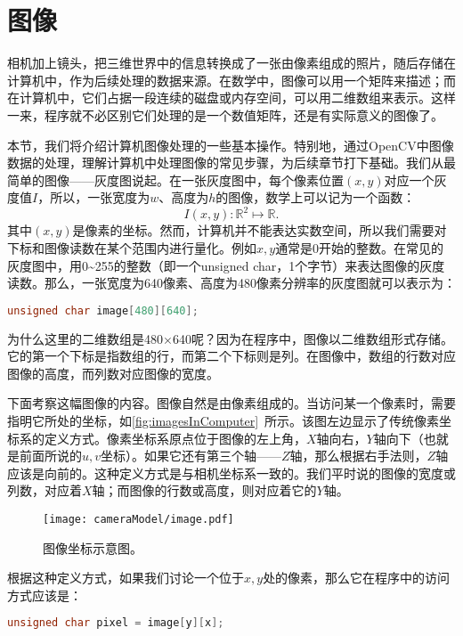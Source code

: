 \section{图像}
相机加上镜头，把三维世界中的信息转换成了一张由像素组成的照片，随后存储在计算机中，作为后续处理的数据来源。在数学中，图像可以用一个矩阵来描述；而在计算机中，它们占据一段连续的磁盘或内存空间，可以用二维数组来表示。这样一来，程序就不必区别它们处理的是一个数值矩阵，还是有实际意义的图像了。

本节，我们将介绍计算机图像处理的一些基本操作。特别地，通过OpenCV中图像数据的处理，理解计算机中处理图像的常见步骤，为后续章节打下基础。我们从最简单的图像——灰度图说起。在一张灰度图中，每个像素位置$(x,y)$对应一个灰度值$I$，所以，一张宽度为$w$、高度为$h$的图像，数学上可以记为一个函数：
\[
{I} (x,y): \mathbb{R}^2 \mapsto \mathbb{R}.
\]
其中$(x,y)$是像素的坐标。然而，计算机并不能表达实数空间，所以我们需要对下标和图像读数在某个范围内进行量化。例如$x,y$通常是0开始的整数。在常见的灰度图中，用0\textasciitilde255的整数（即一个unsigned char，1个字节）来表达图像的灰度读数。那么，一张宽度为640像素、高度为480像素分辨率的灰度图就可以表示为：

\begin{lstlisting}[language=C++, caption=二维数组表达图像]
unsigned char image[480][640];
\end{lstlisting}

为什么这里的二维数组是480$\times$640呢？因为在程序中，图像以二维数组形式存储。它的第一个下标是指数组的行，而第二个下标则是列。在图像中，数组的行数对应图像的高度，而列数对应图像的宽度。

下面考察这幅图像的内容。图像自然是由像素组成的。当访问某一个像素时，需要指明它所处的坐标，如\autoref{fig:imagesInComputer}~所示。该图左边显示了传统像素坐标系的定义方式。像素坐标系原点位于图像的左上角，$X$轴向右，$Y$轴向下（也就是前面所说的$u,v$坐标）。如果它还有第三个轴——$Z$轴，那么根据右手法则，$Z$轴应该是向前的。这种定义方式是与相机坐标系一致的。我们平时说的图像的宽度或列数，对应着$X$轴；而图像的行数或高度，则对应着它的$Y$轴。

\begin{figure}[!t]
	\centering
	\texttt{[image: cameraModel/image.pdf]}
	\caption{图像坐标示意图。}
	\label{fig:imagesInComputer}
\end{figure}
	
根据这种定义方式，如果我们讨论一个位于$x,y$处的像素，那么它在程序中的访问方式应该是：
\begin{lstlisting}[language=C++, caption=访问图像像素]
unsigned char pixel = image[y][x];
\end{lstlisting}

